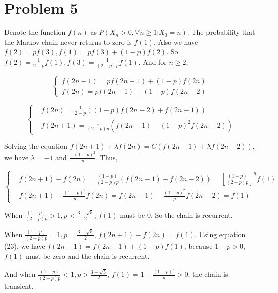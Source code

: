 \documentclass{article}
\begin{document}
\section{Problem 5}

Denote the function $f(n)$ as $P(X_n >0, \forall n\geqslant 1 | X_0 = n)$. The probability that the Markov chain never returns to zero is $ f(1)$. Also we have $f(2) = p f(3), f(1)= pf(3)+ (1-p)f(2)$. So $f(2) = \frac{1}{2-p}f(1),f(3) = \frac{1}{(2-p)p} f(1)$. And for $n\geqslant 2$, 


\begin{equation}
    \left\{ 
        \begin{aligned}
            f(2n-1) = pf(2n+1) + (1-p) f(2n) \\
        f(2n) = pf(2n+1) + (1-p) f(2n-2)
        \end{aligned}
    \right.
\end{equation}

\begin{equation}
    \left\{ 
        \begin{aligned}
            &f(2n) = \frac{1}{2-p} ((1-p)f(2n-2) + f(2n-1)) \\
            &f(2n+1) = \frac{1}{(2-p)p} (f(2n-1) -(1-p)^2 f(2n-2))
        \end{aligned}
    \right.
\end{equation}

Solving the equation $f(2n+1)+\lambda f(2n) = C(f(2n-1)+\lambda f(2n-2))$, we have $\lambda=-1$ and $\frac{-(1-p)^2}{p}$. Thus,

\begin{equation}
    \left\{ 
        \begin{aligned}
            & f(2n+1)-f(2n) = \frac{(1-p)}{(2-p)p} (f(2n-1)  -f(2n-2)) = \left[\frac{(1-p)}{(2-p)p}\right]^n f(1) \\
            &f(2n+1)-\frac{(1-p)^2}{ p} f(2n) = f(2n-1)-\frac{(1-p)^2}{ p} f(2n-2) = f(1)
        \end{aligned}
    \right.
\end{equation}

When $ \frac{(1-p)}{(2-p)p} >1, p<\frac{3-\sqrt{5}}{2}$, $f(1)$ must be $0$. So the chain is recurrent.

When $\frac{(1-p)}{(2-p)p}  = 1, p = \frac{3-\sqrt{5}}{2}$, $f(2n+1)-f(2n) = f(1)$. Using equation (23), we have $f(2n+1) =  f(2n-1)+(1-p)f(1)$, because $1-p >0$, $f(1)$ must be zero and the chain is recurrent.

And when $\frac{(1-p)}{(2-p)p}  < 1, p>\frac{3-\sqrt{5}}{2}$, $f(1) = 1 - \frac{(1-p)^2}{p} >0$, the chain is transient.
\end{document}

